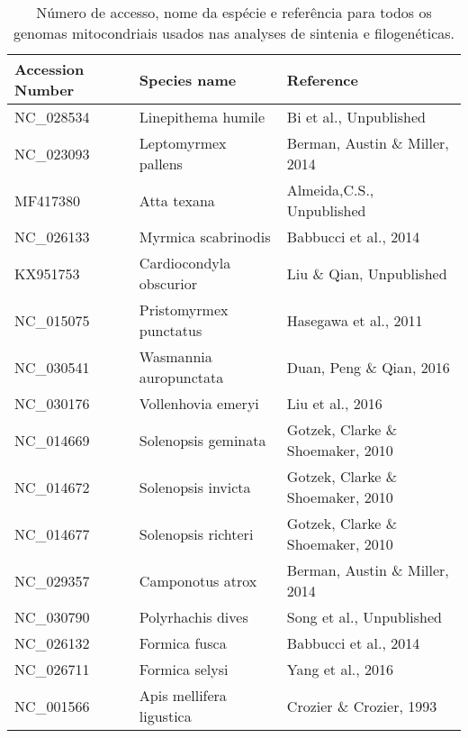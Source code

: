 \documentclass[../DISSERTACAO_MAIN.tex]{subfiles}
\begin{document}
	
	\restoregeometry

\newpage

\begin{table}
	\caption{Número de accesso, nome da espécie e referência para todos os genomas mitocondriais usados nas analyses de sintenia e filogenéticas.}\label{tab:s2}
	\begin{tabular}{|l|l|l|}
		\hline Accession Number & Species name                & Reference                               \\
		\hline NC\_028534       & Linepithema 			humile       & Bi 			et al., Unpublished               \\
		NC\_023093       & Leptomyrmex 			pallens      & Berman, 			Austin \& Miller, 2014       \\
		MF417380         & Atta 			texana              & Almeida,C.S., 			Unpublished            \\
		NC\_026133       & Myrmica 			scabrinodis      & Babbucci 			et al., 2014                \\
		KX951753         & Cardiocondyla 			obscurior  & Liu 			\& Qian, Unpublished             \\
		NC\_015075       & Pristomyrmex 			punctatus   & Hasegawa 			et al., 2011                \\
		NC\_030541       & Wasmannia 			auropunctata   & Duan, 			Peng \& Qian, 2016             \\
		NC\_030176       & Vollenhovia 			emeryi       & Liu 			et al., 2016                     \\
		NC\_014669       & Solenopsis 			geminata      & Gotzek, 			Clarke \& Shoemaker, 2010    \\
		NC\_014672       & Solenopsis 			invicta       & Gotzek, 			Clarke \& Shoemaker, 2010    \\
		NC\_014677       & Solenopsis 			richteri      & Gotzek, 			Clarke \& Shoemaker, 2010    \\
		NC\_029357       & Camponotus 			atrox         & Berman, 			Austin 			\& 			Miller, 2014 \\
		NC\_030790       & Polyrhachis 			dives        & Song 			et al., Unpublished             \\
		NC\_026132       & Formica 			fusca            & Babbucci 			et al., 2014                \\
		NC\_026711       & Formica 			selysi           & Yang 			et al., 2016                    \\
		NC\_001566       & Apis 			mellifera ligustica & Crozier 			\& Crozier, 1993             \\

\end{tabular}
\end{table}
\end{document}
